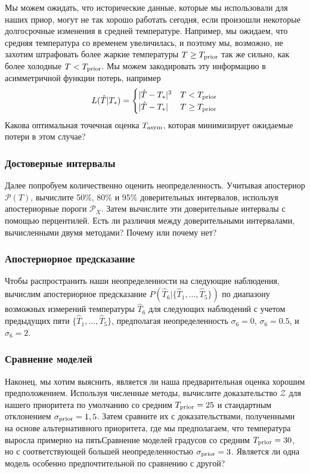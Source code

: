 \documentclass[12pt, titlepage]{article}
\newcommand{\posterior}{\ensuremath{\mathcal{P}}}
\newcommand{\evidence}{\ensuremath{\mathcal{Z}}}
\begin{document}
Мы можем ожидать, что исторические данные, которые мы использовали для наших приор, могут не так хорошо работать сегодня, если произошли некоторые долгосрочные изменения в средней температуре. Например, мы ожидаем, что средняя температура со временем увеличилась, и поэтому мы, возможно, не захотим штрафовать более жаркие температуры $T \geq T_{\rm prior}$ так же сильно, как более холодные $T < T_{\rm prior}$. Мы можем закодировать эту информацию в асимметричной функции потерь, например
\begin{equation*}
    L(\hat{T}|T_*) = 
    \begin{cases}
    |\hat{T} - T_*|^3 & T < T_{\rm prior} \\
    |\hat{T} - T_*| & T \geq T_{\rm prior}
    \end{cases}
\end{equation*}
Какова оптимальная точечная оценка $T_{\rm asym}$, которая минимизирует ожидаемые потери в этом случае?

\subsubsection*{Достоверные интервалы}

Далее попробуем количественно оценить неопределенность. Учитывая апостериор $\posterior(T)$, вычислите 50\%, 80\% и 95\% доверительных интервалов, используя апостериорные пороги $\posterior_X$. Затем вычислите эти доверительные интервалы с помощью перцентилей. Есть ли различия между доверительными интервалами, вычисленными двумя методами? Почему или почему нет?

\subsubsection*{Апостериорное предсказание}

Чтобы распространить наши неопределенности на следующие наблюдения, вычислим апостериорное предсказание $P(\hat{T}_6|\{ \hat{T}_1, \dots, \hat{T}_5 \})$ по диапазону возможных измерений температуры $\hat{T}_6$ для следующих наблюдений с учетом предыдущих пяти $\{ \hat{T}_1, \dots, \hat{T}_5 \}$, предполагая неопределенность $\sigma_6=0$, $\sigma_6=0. 5$, и $\sigma_6=2$.

\subsubsection*{Сравнение моделей}

Наконец, мы хотим выяснить, является ли наша предварительная оценка хорошим предположением. Используя численные методы, вычислите доказательство $\evidence$ для нашего приоритета по умолчанию со средним $T_{\rm prior} = 25$ и стандартным отклонением $\sigma_{\rm prior} = 1,5$. Затем сравните их с доказательствами, полученными на основе альтернативного приоритета, где мы предполагаем, что температура выросла примерно на пятьСравнение моделей градусов со средним $T_{\rm prior} = 30$, но с соответствующей большей неопределенностью $\sigma_{\rm prior} = 3$. Является ли одна модель особенно предпочтительной по сравнению с другой?
\end{document}
